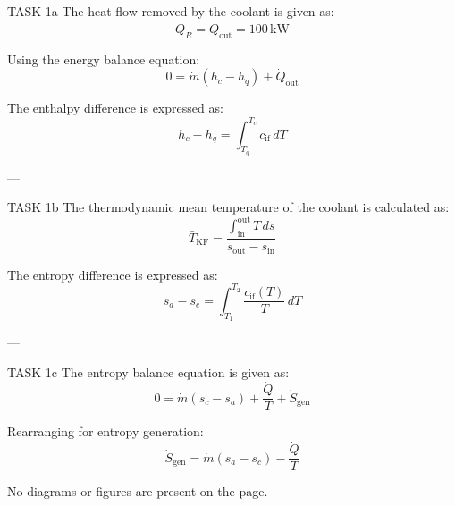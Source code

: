 TASK 1a  
The heat flow removed by the coolant is given as:  
\[
\dot{Q}_R = \dot{Q}_{\text{out}} = 100 \, \text{kW}
\]  

Using the energy balance equation:  
\[
0 = \dot{m} \left( h_c - h_q \right) + \dot{Q}_{\text{out}}
\]  

The enthalpy difference is expressed as:  
\[
h_c - h_q = \int_{T_q}^{T_c} c_{\text{if}} \, dT
\]  

---

TASK 1b  
The thermodynamic mean temperature of the coolant is calculated as:  
\[
\bar{T}_{\text{KF}} = \frac{\int_{\text{in}}^{\text{out}} T \, ds}{s_{\text{out}} - s_{\text{in}}}
\]  

The entropy difference is expressed as:  
\[
s_a - s_e = \int_{T_1}^{T_2} \frac{c_{\text{if}}(T)}{T} \, dT
\]  

---

TASK 1c  
The entropy balance equation is given as:  
\[
0 = \dot{m} \left( s_c - s_a \right) + \frac{\dot{Q}}{T} + \dot{S}_{\text{gen}}
\]  

Rearranging for entropy generation:  
\[
\dot{S}_{\text{gen}} = \dot{m} \left( s_a - s_c \right) - \frac{\dot{Q}}{T}
\]  

No diagrams or figures are present on the page.